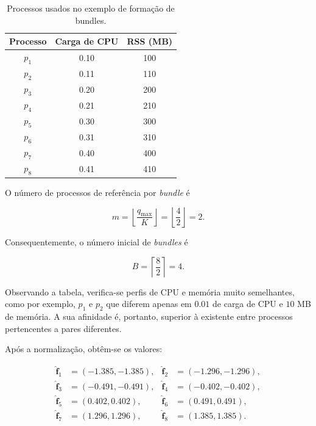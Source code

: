 \begin{table}[H]
\centering
\begin{tabular}{|c|c|c|}
\hline
\textbf{Processo} & \textbf{Carga de CPU} & \textbf{RSS (MB)} \\
\hline
$p_1$ & 0.10 & 100 \\
$p_2$ & 0.11 & 110 \\
$p_3$ & 0.20 & 200 \\
$p_4$ & 0.21 & 210 \\
$p_5$ & 0.30 & 300 \\
$p_6$ & 0.31 & 310 \\
$p_7$ & 0.40 & 400 \\
$p_8$ & 0.41 & 410 \\
\hline
\end{tabular}
\caption{Processos usados no exemplo de formação de bundles.}
\label{tab:exemplo-processos-bundles}
\end{table}

O número de processos de referência por \textit{bundle} é

\begin{equation}
    m=\left\lfloor\frac{q_{\max}}{K}\right\rfloor
    =\left\lfloor\frac{4}{2}\right\rfloor=2.
\end{equation}

Consequentemente, o número inicial de \textit{bundles} é

\begin{equation}
    B=\left\lceil\frac{8}{2}\right\rceil=4.
\end{equation}

Observando a tabela, verifica-se perfis de CPU e memória muito semelhantes, como por exemplo, $p_1$ e $p_2$ que diferem apenas em $0.01$ de carga de CPU e
$10$ MB de memória. A sua afinidade é, portanto, superior à existente
entre processos pertencentes a pares diferentes.

Após a normalização, obtêm-se os valores:

\begin{equation}
\begin{aligned}
\hat{\mathbf{f}}_1 &= (-1.385,-1.385), &
\hat{\mathbf{f}}_2 &= (-1.296,-1.296),\\
\hat{\mathbf{f}}_3 &= (-0.491,-0.491), &
\hat{\mathbf{f}}_4 &= (-0.402,-0.402),\\
\hat{\mathbf{f}}_5 &= ( 0.402, 0.402), &
\hat{\mathbf{f}}_6 &= ( 0.491, 0.491),\\
\hat{\mathbf{f}}_7 &= ( 1.296, 1.296), &
\hat{\mathbf{f}}_8 &= ( 1.385, 1.385).
\end{aligned}
\end{equation}

